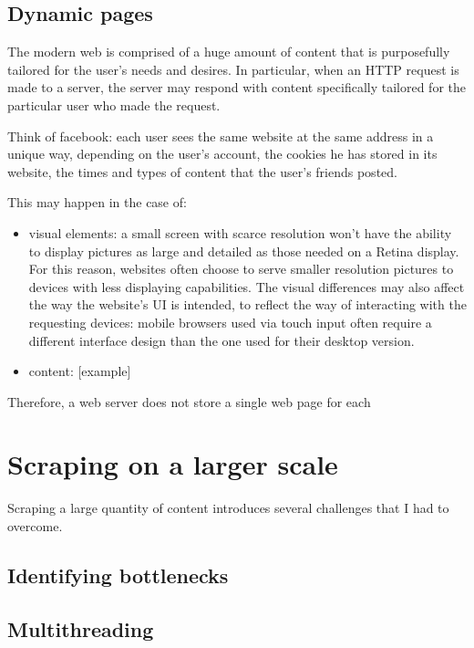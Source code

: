 \documentclass[LaM,binding=0.6cm]{sapthesis}
\begin{document}
\subsection{Dynamic pages}

The modern web is comprised of a huge amount of content that is purposefully tailored for the user's needs and desires. In particular, when an HTTP request is made to a server, the server may respond with content specifically tailored for the particular user who made the request.

Think of facebook: each user sees the same website at the same address in a unique way, depending on the user's account, the cookies he has stored in its website, the times and types of content that the user's friends posted.

This may happen in the case of:

\begin{itemize}
	\item visual elements: a small screen with scarce resolution won't have the ability to display pictures as large and detailed as those needed on a Retina display. For this reason, websites often choose to serve smaller resolution pictures to devices with less displaying capabilities. The visual differences may also affect the way the website's UI is intended, to reflect the way of interacting with the requesting devices: mobile browsers used via touch input often require a different interface design than the one used for their desktop version.
	\item content: [example]
\end{itemize}

Therefore, a web server does not store a single web page for each 

\section{Scraping on a larger scale}

Scraping a large quantity of content introduces several challenges that I had to overcome. 

\subsection{Identifying bottlenecks}

\subsection{Multithreading}
\end{document}
